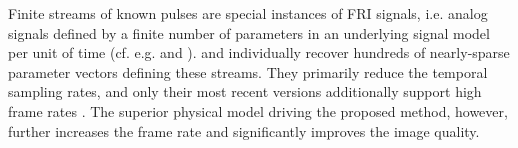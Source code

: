{  %
  Finite streams of
  known pulses are
  special instances of
  \acl{FRI} signals, i.e.
  analog signals defined by
  a finite number of
  parameters in
  an underlying signal model per
  unit of
  time
  (cf. e.g.
  \cite{article:BluISPM2008} and
  \cite{article:VetterliITSP2002}%
  ).
} and individually recover
hundreds of
nearly-sparse parameter vectors defining
these streams.
They primarily reduce
the temporal sampling rates, and only
their most recent versions additionally support
high frame rates
\cite{article:ChernyakovaITUFFC2018,proc:SchiffnerIUS2016a}.
The superior physical model driving
the proposed method, however, further increases
the frame rate and significantly improves
the image quality.
